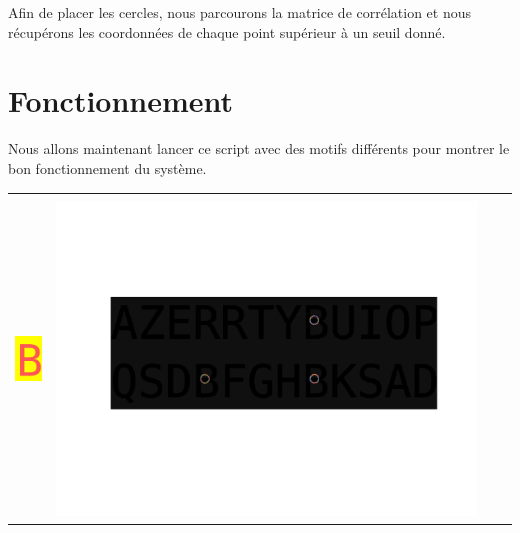 \documentclass[a4paper,12pt,titlepage]{report}
\begin{document}
	Afin de placer les cercles, nous parcourons la matrice de corrélation et nous récupérons les coordonnées de chaque point supérieur à un seuil donné. 
	\section{Fonctionnement}	
	Nous allons maintenant lancer ce script avec des motifs différents pour montrer le bon fonctionnement du système.
	\begin{center}
	\begin{tabular}{|cc|cc|}
			\hline
			& & & \\
			\includegraphics[scale=0.45]{../motif.png} & \includegraphics[scale=0.15]{illus/motiflocal0.png} &

\end{tabular}
\end{center}
\end{document}
